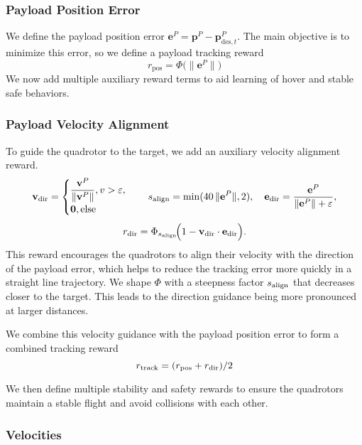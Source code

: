 \subsubsection{Payload Position Error}
We define the payload position error \(\mathbf{e}^P = \mathbf{p}^P - \mathbf{p}^P_{\mathrm{des},t}\). The main objective is to minimize this error, so we define a payload tracking reward
\begin{equation}
r_{\mathrm{pos}} = \Phi\bigl(\|\mathbf{e}^P\|\bigr)
\end{equation}
We now add multiple auxiliary reward terms to aid learning of hover and stable safe behaviors.
\subsubsection{Payload Velocity Alignment}
To guide the quadrotor to the target, we add an auxiliary velocity alignment reward.
\begin{equation}
\mathbf{v}_{\rm dir} =
\begin{cases}
\dfrac{\mathbf{v}^P}{\lVert \mathbf{v}^P\rVert},  v > \varepsilon,\\[4pt]
\mathbf{0},  \text{else}
\end{cases}
\quad
s_{\rm align} = \min(40\,\|\mathbf{e}^P\|,2), \quad
\mathbf{e}_{\rm dir} = \dfrac{\mathbf{e}^P}{\|\mathbf{e}^P\| + \varepsilon},
\end{equation}
\begin{equation}
r_{\rm dir} = \Phi_{s_{\rm align}}\!\Bigl(1 - \mathbf{v}_{\rm dir}\cdot\mathbf{e}_{\rm dir}\Bigr).
\end{equation}
This reward encourages the quadrotors to align their velocity with the direction of the payload error, which helps to reduce the tracking error more quickly in a straight line trajectory. We shape $\Phi$ with a steepness factor $s_{\rm align}$ that decreases closer to the target. This leads to the direction guidance being more pronounced at larger distances.

We combine this velocity guidance with the payload position error to form a combined tracking reward
\begin{equation}
r_{\mathrm{track}} =(r_{\mathrm{pos}} + r_{\rm dir})/2
\end{equation}

We then define multiple stability and safety rewards to ensure the quadrotors maintain a stable flight and avoid collisions with each other.

\subsubsection{Velocities}

